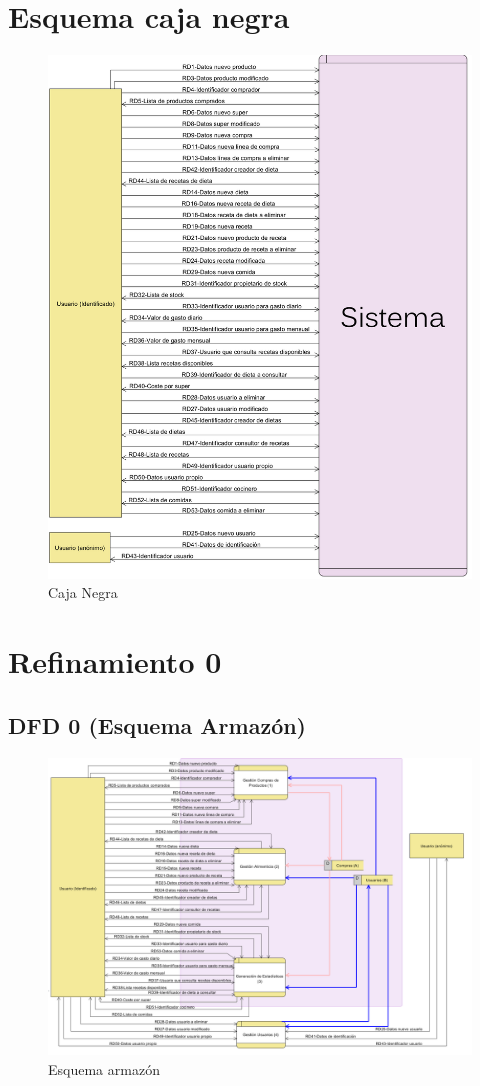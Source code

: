 \documentclass[a4paper,12pt]{report}
\begin{document}
\chapter{Esquema caja negra}
\label{sec-3}
\begin{figure}[!htp]
\centering
\includegraphics[width=0.9\linewidth]{./refinamientos/cajanegra.png}
\caption{Caja Negra}
\label{fig:Caja Negra}
\medskip
\footnotesize
{}
\end{figure}
\chapter{Refinamiento 0}
\label{sec-4}
\section{DFD 0 (Esquema Armazón)}
\label{sec-4-1}
\begin{figure}[!htp]
\centering
\includegraphics[width=0.9\linewidth]{./refinamientos/dfd0.png}
\caption{Esquema armazón}
\label{fig:Esquema armazón}
\medskip
\footnotesize
{}
\end{figure}
\end{document}
